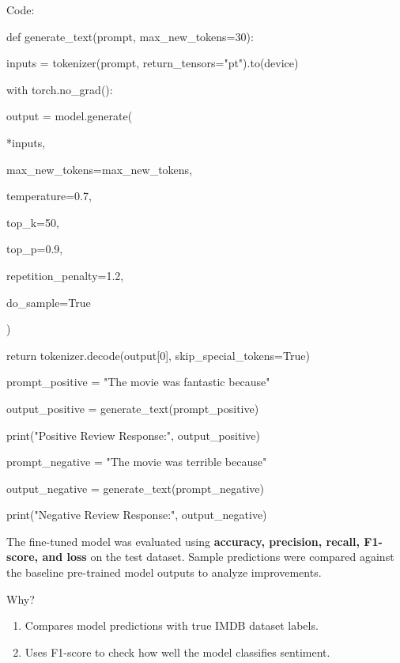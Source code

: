 \documentclass{article} %
\begin{document}
\noindent \begin{flushleft}
Code:

\noindent def generate\_text(prompt, max\_new\_tokens=30):

\noindent     inputs = tokenizer(prompt, return\_tensors="pt").to(device)

\noindent     with torch.no\_grad():

\noindent         output = model.generate(

\noindent             **inputs,

\noindent             max\_new\_tokens=max\_new\_tokens,

\noindent             temperature=0.7,

\noindent             top\_k=50,

\noindent             top\_p=0.9,

\noindent             repetition\_penalty=1.2,

\noindent             do\_sample=True

\noindent         )

\noindent     return tokenizer.decode(output[0], skip\_special\_tokens=True)

\noindent prompt\_positive = "The movie was fantastic because"

\noindent output\_positive = generate\_text(prompt\_positive)

\noindent print("Positive Review Response:", output\_positive)

\noindent prompt\_negative = "The movie was terrible because"

\noindent output\_negative = generate\_text(prompt\_negative)

\noindent print("Negative Review Response:", output\_negative)

\noindent 
\newline

\noindent \textbf{}
\newline

\noindent The fine-tuned model was evaluated using \textbf{accuracy, precision, recall, F1-score, and loss} on the test dataset. Sample predictions were compared against the baseline pre-trained model outputs to analyze improvements.

\noindent Why?
\end{flushleft}

\begin{enumerate}
\item  Compares model predictions with true IMDB dataset labels.

\item  Uses F1-score to check how well the model classifies sentiment.
\end{enumerate}
\end{document}
